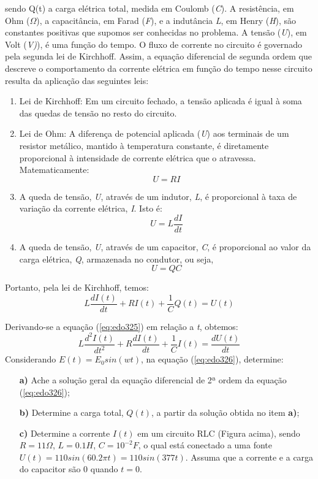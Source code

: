 sendo Q(t) a carga elétrica total, medida em Coulomb (\textit{C}). A resistência, em Ohm ($\Omega$), a capacitância, em Farad (\textit{F}), e a indutância \textit{L}, em Henry (\textit{H}), são constantes positivas que supomos ser conhecidas no problema. A tensão (\textit{U}), em Volt (\textit{V)}), é uma função do tempo. O fluxo de corrente no circuito é governado pela segunda lei de Kirchhoff.  Assim, a equação diferencial de segunda ordem que descreve o comportamento da corrente elétrica em função do tempo nesse circuito resulta da aplicação das seguintes leis:
\begin{enumerate}
    \item Lei de Kirchhoff: Em um circuito fechado, a tensão aplicada é igual à soma das quedas de tensão no resto do circuito.
    \item Lei de Ohm: A diferença de potencial aplicada (\textit{U}) aos terminais de um resistor metálico, mantido à temperatura constante, é diretamente proporcional à intensidade de corrente elétrica que o atravessa. Matematicamente:
    \begin{equation}
        U=RI
        \label{eq:edo322}
    \end{equation}
    \item A queda de tensão, \textit{U}, através de um indutor, \textit{L}, é proporcional à taxa de variação da corrente elétrica, \textit{I}. Isto é:
    \begin{equation}
        U = L\frac{dI}{dt}
        \label{eq:edo323}
    \end{equation}
    \item A queda de tensão, \textit{U}, através de um capacitor, \textit{C}, é proporcional ao valor da carga elétrica, \textit{Q}, armazenada no condutor, ou seja,
    \begin{equation}
        \label{eq:edo324}
        U = QC
    \end{equation}
\end{enumerate}
Portanto, pela lei de Kirchhoff, temos:
\begin{equation}
    L\frac{dI(t)}{dt} + RI(t) + \frac{1}{C}Q(t) = U(t)    \label{eq:edo325}
\end{equation}

Derivando-se a equação (\ref{eq:edo325}) em relação a \textit{t}, obtemos:
\begin{equation}
    L\frac{d^2I(t)}{dt^2} + R\frac{dI(t)}{dt} + \frac{1}{C}I(t) = \frac{dU(t)}{dt}
    \label{eq:edo326}
\end{equation}
Considerando $E(t) = E_0sin(wt)$, na equação (\ref{eq:edo326}), determine:
\begin{itemize}
    \item[\textbf{a)}] Ache a solução geral da equação diferencial de 2ª ordem da equação (\ref{eq:edo326});
    \item[\textbf{b)}] Determine a carga total, $Q(t)$, a partir da solução obtida no item \textbf{a)};
    \item[\textbf{c)}] Determine a corrente $I(t)$ em um circuito RLC (Figura acima), sendo $R = 11\Omega$, $L = 0.1H$, $C = 10^{-2}F$, o qual está conectado a uma fonte $U(t) = 110sin(60.2\pi t) = 110sin(377t)$. Assuma que a corrente e a carga do capacitor são 0 quando $t=0$.
\end{itemize}
